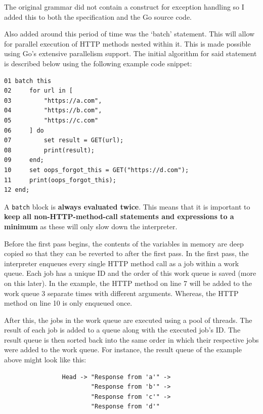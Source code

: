 \documentclass[]{interim}
\theoremstyle{definition}
\begin{document}
The original grammar did not contain a construct for exception handling so I added this to both the specification and the Go source code.

Also added around this period of time was the `batch' statement. This will allow for parallel execution of HTTP methods nested within it. This is made possible using Go's extensive parallelism support. The initial algorithm for said statement is described below using the following example code snippet:

\begin{center}
    \begin{verbatim}
01 batch this
02     for url in [
03         "https://a.com",
04         "https://b.com",
05         "https://c.com"
06     ] do
07         set result = GET(url);
08         print(result);
09     end;
10     set oops_forgot_this = GET("https://d.com");
11     print(oops_forgot_this);
12 end;
    \end{verbatim}
\end{center}

A \verb|batch| block is \textbf{always evaluated twice}. This means that it is important to \textbf{keep all non-HTTP-method-call statements and expressions to a minimum} as these will only slow down the interpreter.

Before the first pass begins, the contents of the variables in memory are deep copied so that they can be reverted to after the first pass. In the first pass, the interpreter enqueues every single HTTP method call as a job within a work queue. Each job has a unique ID and the order of this work queue is saved (more on this later). In the example, the HTTP method on line 7 will be added to the work queue 3 separate times with different arguments. Whereas, the HTTP method on line 10 is only enqueued once.

After this, the jobs in the work queue are executed using a pool of threads. The result of each job is added to a queue along with the executed job's ID. The result queue is then sorted back into the same order in which their respective jobs were added to the work queue. For instance, the result queue of the example above might look like this:

\begin{center}
    \begin{verbatim}
                Head -> "Response from 'a'" ->
                        "Response from 'b'" ->
                        "Response from 'c'" ->
                        "Response from 'd'"
    \end{verbatim}
\end{center}
\end{document}

